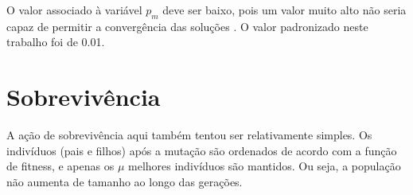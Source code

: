 O valor associado à variável $p_m$ deve ser baixo, pois um valor muito alto não seria capaz de permitir a convergência das soluções \cite{dejong1975analysis, eiben2011parameter, obitkopc}. O valor padronizado neste trabalho foi de 0.01.

\section{Sobrevivência}

A ação de sobrevivência aqui também tentou ser relativamente simples. Os indivíduos (pais e filhos) após a mutação são ordenados de acordo com a função de fitness, e apenas os $\mu$ melhores indivíduos são mantidos. Ou seja, a população não aumenta de tamanho ao longo das gerações.

